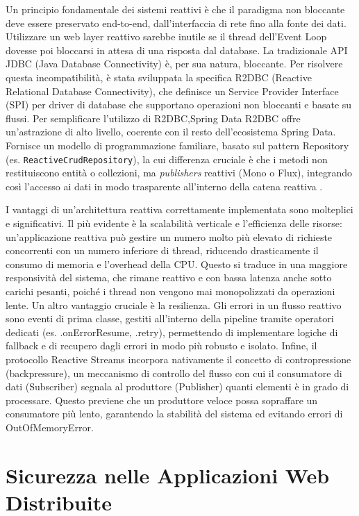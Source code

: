 \documentclass[12pt,a4paper,openright,twoside]{book}
\begin{document}
Un principio fondamentale dei sistemi reattivi è che il paradigma non bloccante deve essere preservato end-to-end, dall'interfaccia di rete fino alla fonte dei dati. Utilizzare un web layer reattivo sarebbe inutile se il thread dell'Event Loop dovesse poi bloccarsi in attesa di una risposta dal database. La tradizionale API JDBC (Java Database Connectivity) è, per sua natura, bloccante. Per risolvere questa incompatibilità, è stata sviluppata la specifica R2DBC (Reactive Relational Database Connectivity), che definisce un Service Provider Interface (SPI) per driver di database che supportano operazioni non bloccanti e basate su flussi. Per semplificare l'utilizzo di R2DBC,Spring Data R2DBC offre un'astrazione di alto livello, coerente con il resto dell'ecosistema Spring Data. Fornisce un modello di programmazione familiare, basato sul pattern Repository (es. \texttt{ReactiveCrudRepository}), la cui differenza cruciale è che i metodi non restituiscono entità o collezioni, ma \textit{publishers} reattivi (Mono o Flux), integrando così l'accesso ai dati in modo trasparente all'interno della catena reattiva \cite{spring_reactive}.

I vantaggi di un'architettura reattiva correttamente implementata sono molteplici e significativi. Il più evidente è la scalabilità verticale e l'efficienza delle risorse: un'applicazione reattiva può gestire un numero molto più elevato di richieste concorrenti con un numero inferiore di thread, riducendo drasticamente il consumo di memoria e l'overhead della CPU. Questo si traduce in una maggiore responsività del sistema, che rimane reattivo e con bassa latenza anche sotto carichi pesanti, poiché i thread non vengono mai monopolizzati da operazioni lente. Un altro vantaggio cruciale è la resilienza. Gli errori in un flusso reattivo sono eventi di prima classe, gestiti all'interno della pipeline tramite operatori dedicati (es. .onErrorResume, .retry), permettendo di implementare logiche di fallback e di recupero dagli errori in modo più robusto e isolato. Infine, il protocollo Reactive Streams incorpora nativamente il concetto di contropressione (backpressure), un meccanismo di controllo del flusso con cui il consumatore di dati (Subscriber) segnala al produttore (Publisher) quanti elementi è in grado di processare. Questo previene che un produttore veloce possa sopraffare un consumatore più lento, garantendo la stabilità del sistema ed evitando errori di OutOfMemoryError.


\section{Sicurezza nelle Applicazioni Web Distribuite}
\end{document}
